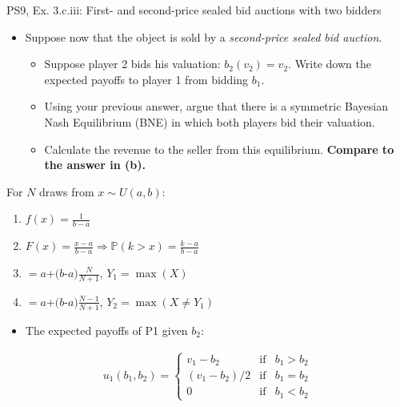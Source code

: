 \begin{frame}{PS9, Ex. 3.c.iii: First- and second-price sealed bid auctions with two bidders}
    \begin{multicols}{2}
      \begin{itemize}
        \item[(c)] Suppose now that the object is sold by a \textit{second-price sealed bid auction}.
        \begin{itemize}\normalsize
          \item[i.]   Suppose player 2 bids his valuation: $b_2(v_2) = v_2$. Write down the expected payoffs to player 1 from bidding $b_1$.
          \item[ii.]  Using your previous answer, argue that there is a symmetric Bayesian Nash Equilibrium (BNE) in which both players bid their valuation.
          \item[iii.] Calculate the revenue to the seller from this equilibrium. \textbf{Compare to the answer in (b).}
        \end{itemize}
      \end{itemize}
      For $N$ draws from $x\sim U(a, b):$
      \vspace{-6pt}
      \begin{enumerate}
        \item[PDF:] $f(x)=\frac{1}{b-a}$
        \item[CDF:] $F(x)=\frac{x-a}{b-a}\Rightarrow\mathbb{P}(k>x)=\frac{k-a}{b-a}$
        \item[$\mathbb{E}(Y_1)$] $=a$+$(b$-$a)\frac{N}{N+1}$, $Y_1=\max(X)$
        \item[$\mathbb{E}(Y_2)$] $=a$+$(b$-$a)\frac{N-1}{N+1}$, $Y_2=\max(X\neq Y_1)$
      \end{enumerate}
      \vfill\null\columnbreak
      \begin{itemize}
        \item[(i)] The expected payoffs of P1 given $b_2$:
      \end{itemize}
      \vspace{-16pt}
      \begin{align*}
        u_1(b_1,b_2)=\left\{\begin{array}{lcl}
          v_1-b_2     & \text{if} & b_1>b_2 \\
          (v_1-b_2)/2 & \text{if} & b_1=b_2 \\
          0           & \text{if} & b_1<b_2
        \end{array}\right.
      \end{align*}

\end{multicols}
\end{frame}
